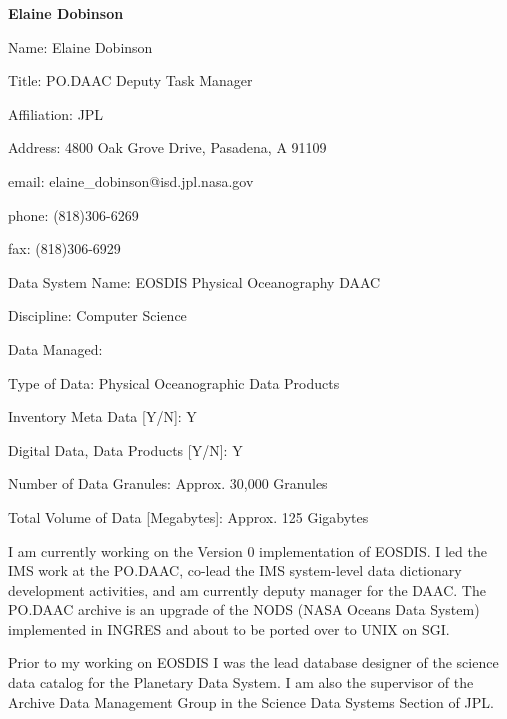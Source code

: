 \begin{center}
\LARGE
{\bf  Elaine Dobinson}
\end{center}
\large
{}
\normalsize
\smallskip
\begin{description}
\item{Name:}  Elaine Dobinson
\item{Title:}  PO.DAAC Deputy Task Manager
\item{Affiliation:}  JPL
\item{Address:}  4800 Oak Grove Drive, Pasadena, A  91109
\item{email:}  elaine\_dobinson@isd.jpl.nasa.gov
\item{phone:}  (818)306-6269
\item{fax:}  (818)306-6929
\end{description}
\medskip
\large
{}
\normalsize
\medskip
\begin{description}
\item{Data System Name:}  EOSDIS Physical Oceanography DAAC
\item{Discipline:}  Computer Science
\item{Data Managed:}
	\begin{description}
	\item{Type of Data:}  Physical Oceanographic Data Products
	\item{Inventory Meta Data [Y/N]:}  Y
	\item{Digital Data, Data Products [Y/N]:}  Y
	\item{Number of Data Granules:}  Approx. 30,000 Granules
	\item{Total Volume of Data [Megabytes]:}  Approx. 125 Gigabytes
	\end{description}
\end{description}

\medskip
\large
{}
\normalsize
\medskip

	I am currently working on the Version 0 implementation of EOSDIS.  I 
led the IMS work at the PO.DAAC, co-lead the IMS system-level data 
dictionary development activities, and am currently deputy manager for 
the DAAC.  The PO.DAAC archive is an upgrade of the NODS (NASA Oceans 
Data System) implemented in INGRES and about to be ported over to UNIX 
on SGI.

	Prior to my working on EOSDIS I was the lead database designer of 
the science data catalog for the Planetary Data System.  I am also the 
supervisor of the Archive Data Management Group in the Science Data 
Systems Section of JPL.
\newpage

